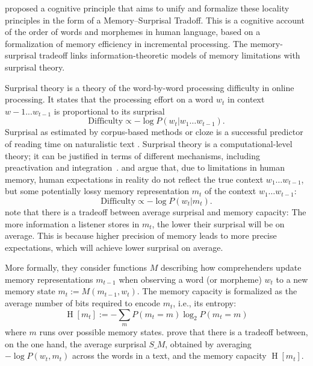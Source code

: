 \documentclass[11pt,letterpaper]{article}
\newcommand{\citep}{\parencite}
\newcommand{\citet}{\Textcite}
\begin{document}
\citet{Hahn2020modeling} proposed a cognitive principle that aims to unify and formalize these locality principles in the form of a Memory--Surprisal Tradoff.
This is a cognitive account of the order of words and morphemes in human language, based on a formalization of memory efficiency in incremental processing.
The memory-surprisal tradeoff links information-theoretic models of memory limitations with surprisal theory.

Surprisal theory \citep{hale2001probabilistic, levy2008expectation} is a theory of the word-by-word processing difficulty in online processing.
It states that the processing effort on a word $w_t$ in context $w-1 ... w_{t-1}$ is proportional to its surprisal
     \begin{equation}   \label{eq:true-surp}
    \text{Difficulty} \propto -\log P(w_t | w_1\dots w_{t-1}).
\end{equation}
Surprisal as estimated by corpus-based methods or cloze is a successful predictor of reading time on naturalistic text \citep{smith2013effect,goodkind-predictive-2018,frank2019interaction,aurnhammer2019evaluating,wilcox2020predictive}. %
Surprisal theory is a computational-level theory; it can be justified in terms of different mechanisms, including preactivation and integration~\citep{kuperberg2016we}.
\citet{futrell-noisy-context-2017-1} and \citet{Hahn2020modeling} argue that, due to limitations in human memory, human expectations in reality do not reflect the true context $w_1\dots w_{t-1}$, but some potentially lossy memory representation $m_t$ of the context $w_1\dots w_{t-1}$:
\begin{equation}   \label{eq:lossy-surp}
    \text{Difficulty} \propto -\log P(w_t | m_t).
\end{equation}
\citet{Hahn2020modeling} note that there is a tradeoff between average surprisal and memory capacity:
The more information a listener stores in $m_t$, the lower their surprisal will be on average.
This is because higher precision of memory leads to more precise expectations, which will achieve lower surprisal on average.

More formally, they consider functions $M$ describing how comprehenders update memory representations $m_{t-1}$ when observing a word (or morpheme) $w_t$ to a new memory state $m_t := M(m_{t-1}, w_t)$.
The memory capacity is formalized as the average number of bits required to encode $m_t$, i.e., its entropy:
\begin{equation*}
    \operatorname{H}[m_t] := - \sum_m P(m_t = m) \log_2 P(m_t=m)
\end{equation*}
where $m$ runs over possible memory states.
\citet{Hahn2020modeling} prove that there is a tradeoff between, on the one hand, the average surprisal $S\_M$, obtained by averaging $- \log P(w_t , m_t)$ across the words in a text, and the memory capacity $\operatorname{H}[m_t]$.
\end{document}
